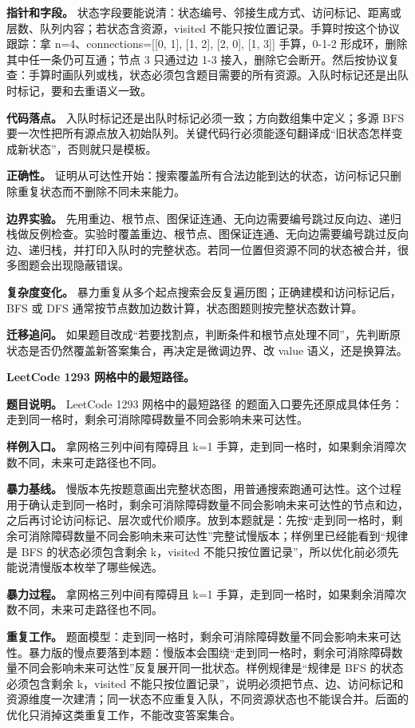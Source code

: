 \textbf{指针和字段。} 状态字段要能说清：状态编号、邻接生成方式、访问标记、距离或层数、队列内容；若状态含资源，visited 不能只按位置记录。手算时按这个协议跟踪：拿 n=4、connections=[[0, 1], [1, 2], [2, 0], [1, 3]] 手算，0-1-2 形成环，删除其中任一条仍可互通；节点 3 只通过边 1-3 接入，删除它会断开。然后按协议复查：手算时画队列或栈，状态必须包含题目需要的所有资源。入队时标记还是出队时标记，要和去重语义一致。

\textbf{代码落点。} 入队时标记还是出队时标记必须一致；方向数组集中定义；多源 BFS 要一次性把所有源点放入初始队列。关键代码行必须能逐句翻译成“旧状态怎样变成新状态”，否则就只是模板。

\textbf{正确性。} 证明从可达性开始：搜索覆盖所有合法边能到达的状态，访问标记只删除重复状态而不删除不同未来能力。

\textbf{边界实验。} 先用重边、根节点、图保证连通、无向边需要编号跳过反向边、递归栈做反例检查。实验时覆盖重边、根节点、图保证连通、无向边需要编号跳过反向边、递归栈，并打印入队时的完整状态。若同一位置但资源不同的状态被合并，很多图题会出现隐蔽错误。

\textbf{复杂度变化。} 暴力重复从多个起点搜索会反复遍历图；正确建模和访问标记后，BFS 或 DFS 通常按节点数加边数计算，状态图题则按完整状态数计算。

\textbf{迁移追问。} 如果题目改成“若要找割点，判断条件和根节点处理不同”，先判断原状态是否仍然覆盖新答案集合，再决定是微调边界、改 value 语义，还是换算法。

\noindent\textbf{LeetCode 1293 网格中的最短路径。}

\textbf{题目说明。} LeetCode 1293 网格中的最短路径 的题面入口要先还原成具体任务：走到同一格时，剩余可消除障碍数量不同会影响未来可达性。

\textbf{样例入口。} 拿网格三列中间有障碍且 k=1 手算，走到同一格时，如果剩余消障次数不同，未来可走路径也不同。

\textbf{暴力基线。} 慢版本先按题意画出完整状态图，用普通搜索跑通可达性。这个过程用于确认走到同一格时，剩余可消除障碍数量不同会影响未来可达性的节点和边，之后再讨论访问标记、层次或代价顺序。放到本题就是：先按“走到同一格时，剩余可消除障碍数量不同会影响未来可达性”完整试慢版本；样例里已经能看到“规律是 BFS 的状态必须包含剩余 k，visited 不能只按位置记录”，所以优化前必须先能说清慢版本枚举了哪些候选。

\textbf{暴力过程。} 拿网格三列中间有障碍且 k=1 手算，走到同一格时，如果剩余消障次数不同，未来可走路径也不同。

\textbf{重复工作。} 题面模型：走到同一格时，剩余可消除障碍数量不同会影响未来可达性。暴力版的慢点要落到本题：慢版本会围绕“走到同一格时，剩余可消除障碍数量不同会影响未来可达性”反复展开同一批状态。样例规律是“规律是 BFS 的状态必须包含剩余 k，visited 不能只按位置记录”，说明必须把节点、边、访问标记和资源维度一次建清；同一状态不应重复入队，不同资源状态也不能误合并。后面的优化只消掉这类重复工作，不能改变答案集合。

